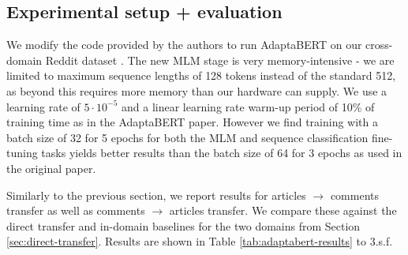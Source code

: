 \subsection{Experimental setup + evaluation} \label{subsec:adaptabert-evaluation}

We modify the code provided by the authors to run AdaptaBERT on our cross-domain Reddit dataset \cite{adaptabert-code}. The new MLM stage is very memory-intensive - we are limited to maximum sequence lengths of 128 tokens instead of the standard 512, as beyond this requires more memory than our hardware can supply. We use a learning rate of $ 5 \cdot 10^{-5} $ and a linear learning rate warm-up period of 10\% of training time as in the AdaptaBERT paper. However we find training with a batch size of 32 for 5 epochs for both the MLM and sequence classification fine-tuning tasks yields better results than the batch size of 64 for 3 epochs as used in the original paper.

Similarly to the previous section, we report results for articles $ \rightarrow $ comments transfer as well as comments $ \rightarrow $ articles transfer. We compare these against the direct transfer and in-domain baselines for the two domains from Section \ref{sec:direct-transfer}. Results are shown in Table \ref{tab:adaptabert-results} to 3.s.f.


